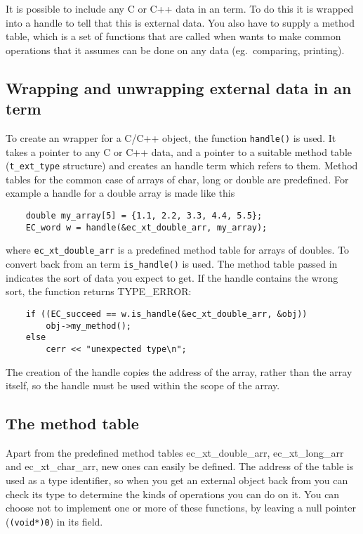 It is possible to include any C or C++ data in an {\eclipse} term. To do this
it is wrapped into a handle to tell {\eclipse} that this is external data.
You also have to supply a method table, which is a set of functions
that are called when {\eclipse} wants to make common operations that it
assumes can be done on any data (eg.\ comparing, printing).


\subsection{Wrapping and unwrapping external data in an {\eclipse} term}

To create an {\eclipse} wrapper for a C/C++ object,
the function \verb.handle(). is used. It takes a pointer to any C or C++
data, and a pointer to a suitable method table (\verb.t_ext_type. structure)
and creates an {\eclipse} handle term which refers to them.
Method tables for the common case of arrays of char, long or double
are predefined. For example a handle for a double array is made like this
\begin{verbatim}
    double my_array[5] = {1.1, 2.2, 3.3, 4.4, 5.5};
    EC_word w = handle(&ec_xt_double_arr, my_array);
\end{verbatim}
where \verb.ec_xt_double_arr. is a predefined method table for arrays of doubles.
To convert back from an {\eclipse} term \verb.is_handle(). is used.
The method table passed in indicates the sort of data you expect to get.
If the {\eclipse} handle contains the wrong sort, the function returns
TYPE_ERROR:
\begin{verbatim}
    if ((EC_succeed == w.is_handle(&ec_xt_double_arr, &obj))
        obj->my_method();
    else
        cerr << "unexpected type\n";
\end{verbatim}

The creation of the handle copies the address of the array, rather than the
array itself, so the handle must be used within the scope of the array.

\subsection{The method table}
Apart from the predefined method tables ec_xt_double_arr,
ec_xt_long_arr and ec_xt_char_arr, new ones can easily be defined.
The address of the table is used as a type identifier, so when you
get an external object back from {\eclipse} you can check its type
to determine the kinds of operations you can do on it.
You can choose not to implement one or more of these functions, by
leaving a null pointer (\verb.(void*)0.) in its field.

